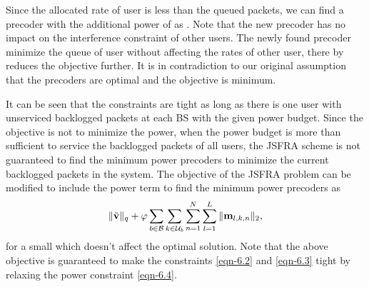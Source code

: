 Since the allocated rate of user  is less than the queued packets, we can find a precoder  with the additional power of  as . Note that the new precoder has no impact on the interference constraint of other users. The newly found precoder  minimize the queue of user  without affecting the rates of other user, there by reduces the objective further. It is in contradiction to our original assumption that the precoders are optimal and the objective is minimum. 

It can be seen that the constraints are tight as long as there is one user with unserviced backlogged packets at each \ac{BS} with the given power budget. Since the objective is not to minimize the power, when the power budget is more than sufficient to service the backlogged packets of all users, the \ac{JSFRA} scheme is not guaranteed to find the minimum power precoders to minimize the current backlogged packets in the system. The objective of the \ac{JSFRA} problem can be modified to include the power term to find the minimum power precoders as
\begin{equation*}
\| \tilde{\mathbf{v}} \|_q + \varphi \sum_{b \in \mathcal{B}} \sum_{k \in \mathcal{U}_b} \sum_{n = 1}^{N} \sum_{l=1}^{L} \|\mathbf{m}_{l,k,n}\|_2,
\end{equation*}
for a small \me{\varphi} which doesn't affect the optimal solution. Note that the above objective is guaranteed to make the constraints \eqref{eqn-6.2} and \eqref{eqn-6.3} tight by relaxing the power constraint \eqref{eqn-6.4}.
